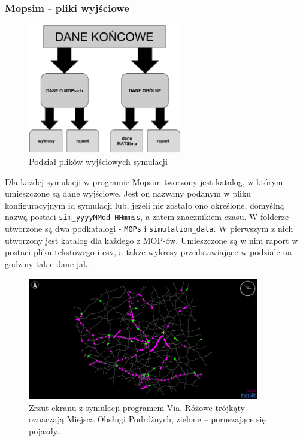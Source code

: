 \subsubsection{Mopsim - pliki wyjściowe}
    \begin{figure}[h]
        \centering
        \caption{Podział plików wyjściowych symulacji}
        \includegraphics[width=0.6\textwidth]{images/mopsim/dane-wyjsciowe.png}
    \end{figure}
Dla każdej symulacji w programie Mopsim tworzony jest katalog, w którym umieszczone są dane wyjściowe. Jest on nazwany podanym w pliku konfiguracyjnym id symulacji lub, jeżeli nie zostało ono określone, domyślną nazwą postaci \texttt{sim\_yyyyMMdd-HHmmss}, a zatem znacznikiem czasu. W folderze utworzone są dwa podkatalogi - \texttt{MOPs} i \texttt{simulation\_data}. W pierwszym z nich utworzony jest katalog dla każdego z MOP-ów. Umieszczone są w nim raport w postaci pliku tekstowego i csv, a także wykresy przedstawiające w podziale na godziny takie dane jak:
    \begin{figure}[!b]
        \centering
        \caption{Zrzut ekranu z symulacji programem Via. Różowe trójkąty oznaczają Miejsca Obsługi Podróżnych,  zielone -- poruszające się pojazdy.}
        \includegraphics[width=0.9\textwidth]{images/mopsim/sim-via.png} 
    \end{figure}
